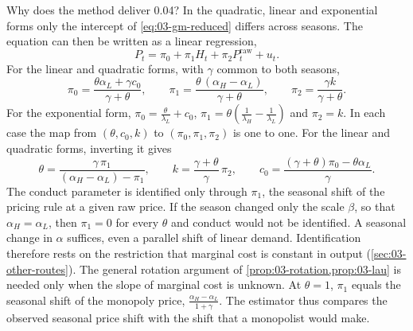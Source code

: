 Why does the method deliver 0.04? In the quadratic, linear and exponential forms only the intercept of
\eqref{eq:03-gm-reduced} differs across seasons. The equation can then be written as a linear regression,
\begin{equation}\label{eq:03-gm-linear-rf}
P_t = \pi_0 + \pi_1 H_t + \pi_2 P^{\mathrm{raw}}_t + u_t .
\end{equation}
For the linear and quadratic forms, with $\gamma$ common to both seasons,
\begin{equation*}
\pi_0 = \frac{\theta\alpha_L + \gamma c_0}{\gamma + \theta},
\qquad
\pi_1 = \frac{\theta\,(\alpha_H - \alpha_L)}{\gamma + \theta},
\qquad
\pi_2 = \frac{\gamma k}{\gamma + \theta}.
\end{equation*}
For the exponential form, $\pi_0 = \frac{\theta}{\lambda_L} + c_0$, $\pi_1 = \theta\left(\frac{1}{\lambda_H} -
\frac{1}{\lambda_L}\right)$ and $\pi_2 = k$. In each case the map from $(\theta, c_0, k)$ to $(\pi_0, \pi_1,
\pi_2)$ is one to one. For the linear and quadratic forms, inverting it gives
\begin{equation}\label{eq:03-gm-inversion}
\theta = \frac{\gamma\,\pi_1}{(\alpha_H - \alpha_L) - \pi_1},
\qquad
k = \frac{\gamma + \theta}{\gamma}\,\pi_2,
\qquad
c_0 = \frac{(\gamma + \theta)\pi_0 - \theta\alpha_L}{\gamma}.
\end{equation}
The conduct parameter is identified only through $\pi_1$, the seasonal shift of the pricing rule at a given
raw price. If the season changed only the scale $\beta$, so that $\alpha_H = \alpha_L$, then $\pi_1 = 0$ for
every $\theta$ and conduct would not be identified. A seasonal change in $\alpha$ suffices, even a parallel
shift of linear demand. Identification therefore rests on the restriction that marginal cost is constant in
output (\cref{sec:03-other-routes}). The general rotation argument of \cref{prop:03-rotation,prop:03-lau} is
needed only when the slope of marginal cost is unknown. At $\theta = 1$,
$\pi_1$ equals the seasonal shift of the monopoly price, $\frac{\alpha_H - \alpha_L}{1 + \gamma}$. The
estimator thus compares the observed seasonal price shift with the shift that a monopolist would make.

